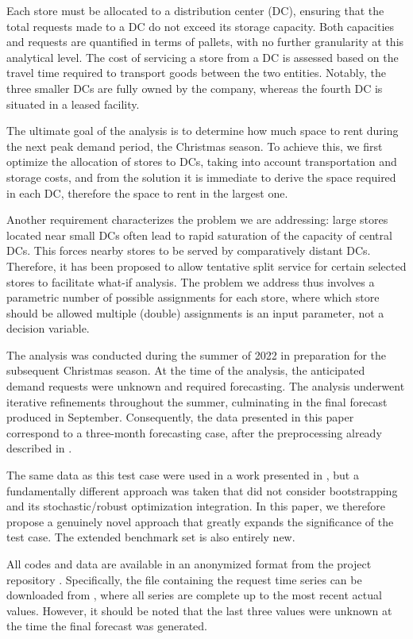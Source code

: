 \documentclass[ijoc,sglanonrev]{informs4}
\begin{document}
Each store must be allocated to a distribution center (DC), ensuring that the total requests made to a DC do not exceed its storage capacity. Both capacities and requests are quantified in terms of pallets, with no further granularity at this analytical level. The cost of servicing a store from a DC is assessed based on the travel time required to transport goods between the two entities. Notably, the three smaller DCs are fully owned by the company, whereas the fourth DC is situated in a leased facility.

The ultimate goal of the analysis is to determine how much space to rent during the next peak demand period, the Christmas season. To achieve this, we first optimize the allocation of stores to DCs, taking into account transportation and storage costs, and from the solution it is immediate to derive the space required in each DC, therefore the space to rent in the largest one.

Another requirement characterizes the problem we are addressing: large stores located near small DCs often lead to rapid saturation of the capacity of central DCs. This forces nearby stores to be served by comparatively distant DCs. Therefore, it has been proposed to allow tentative split service for certain selected stores to facilitate what-if analysis. The problem we address thus involves a parametric number of possible assignments for each store, where which store should be allowed multiple (double) assignments is an input parameter, not a decision variable.  

The analysis was conducted during the summer of 2022 in preparation for the subsequent Christmas season. At the time of the analysis, the anticipated demand requests were unknown and required forecasting. The analysis underwent iterative refinements throughout the summer, culminating in the final forecast produced in September. Consequently, the data presented in this paper correspond to a three-month forecasting case, after the preprocessing already described in \cite{MZ23}. 

The same data as this test case were used in a work presented in \citep{MZ23}, but a fundamentally different approach was taken that did not consider bootstrapping and its stochastic/robust optimization integration. In this paper, we therefore propose a genuinely novel approach that greatly expands the significance of the test case. The extended benchmark set is also entirely new.

All codes and data are available in an anonymized format from the project repository \citep{GDOforecastRepo}. Specifically, the file containing the request time series can be downloaded from \citep{GDOforecastData}, where all series are complete up to the most recent actual values. However, it should be noted that the last three values were unknown at the time the final forecast was generated. 
\end{document}
